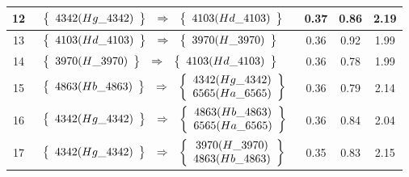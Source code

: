 \begin{longtable}{| c | l | c | c | c |}
12 & $\begin{array}{c c c}\left\{\begin{array}{c}4342 (Hg\_4342)\end{array}\right\} & \Rightarrow & \left\{\begin{array}{c}4103 (Hd\_4103)\end{array}\right\}\end{array}$ & 0.37 & 0.86 & 2.19 \\ \hline
13 & $\begin{array}{c c c}\left\{\begin{array}{c}4103 (Hd\_4103)\end{array}\right\} & \Rightarrow & \left\{\begin{array}{c}3970 (H\_3970)\end{array}\right\}\end{array}$ & 0.36 & 0.92 & 1.99 \\ \hline
14 & $\begin{array}{c c c}\left\{\begin{array}{c}3970 (H\_3970)\end{array}\right\} & \Rightarrow & \left\{\begin{array}{c}4103 (Hd\_4103)\end{array}\right\}\end{array}$ & 0.36 & 0.78 & 1.99 \\ \hline
15 & $\begin{array}{c c c}\left\{\begin{array}{c}4863 (Hb\_4863)\end{array}\right\} & \Rightarrow & \left\{\begin{array}{c}4342 (Hg\_4342) \\ 6565 (Ha\_6565)\end{array}\right\}\end{array}$ & 0.36 & 0.79 & 2.14 \\ \hline
16 & $\begin{array}{c c c}\left\{\begin{array}{c}4342 (Hg\_4342)\end{array}\right\} & \Rightarrow & \left\{\begin{array}{c}4863 (Hb\_4863) \\ 6565 (Ha\_6565)\end{array}\right\}\end{array}$ & 0.36 & 0.84 & 2.04 \\ \hline
17 & $\begin{array}{c c c}\left\{\begin{array}{c}4342 (Hg\_4342)\end{array}\right\} & \Rightarrow & \left\{\begin{array}{c}3970 (H\_3970) \\ 4863 (Hb\_4863)\end{array}\right\}\end{array}$ & 0.35 & 0.83 & 2.15 \\ \hline

\end{longtable}
